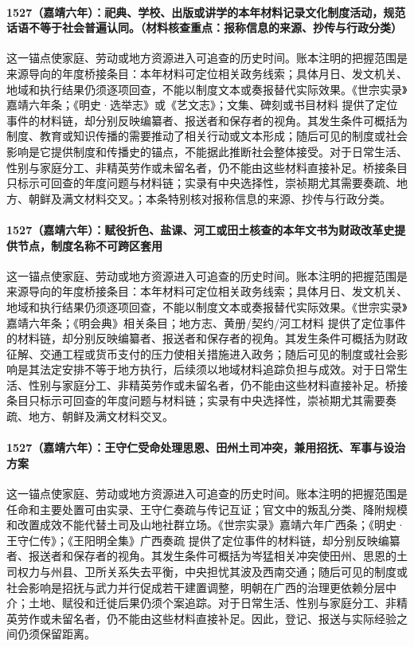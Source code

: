 \paragraph{1527（嘉靖六年）：祀典、学校、出版或讲学的本年材料记录文化制度活动，规范话语不等于社会普遍认同。（材料核查重点：报称信息的来源、抄传与行政分类）} 这一锚点使家庭、劳动或地方资源进入可追查的历史时间。账本注明的把握范围是来源导向的年度桥接条目：本年材料可定位相关政务线索；具体月日、发文机关、地域和执行结果仍须逐项回查，不能以制度文本或奏报替代实际效果。《世宗实录》嘉靖六年条；《明史·选举志》或《艺文志》；文集、碑刻或书目材料 提供了定位事件的材料链，却分别反映编纂者、报送者和保存者的视角。其发生条件可概括为制度、教育或知识传播的需要推动了相关行动或文本形成；随后可见的制度或社会影响是它提供制度和传播史的锚点，不能据此推断社会整体接受。对于日常生活、性别与家庭分工、非精英劳作或未留名者，仍不能由这些材料直接补足。桥接条目只标示可回查的年度问题与材料链；实录有中央选择性，崇祯期尤其需要奏疏、地方、朝鲜及满文材料交叉。；本条特别核对报称信息的来源、抄传与行政分类。

\paragraph{1527（嘉靖六年）：赋役折色、盐课、河工或田土核查的本年文书为财政改革史提供节点，制度名称不可跨区套用} 这一锚点使家庭、劳动或地方资源进入可追查的历史时间。账本注明的把握范围是来源导向的年度桥接条目：本年材料可定位相关政务线索；具体月日、发文机关、地域和执行结果仍须逐项回查，不能以制度文本或奏报替代实际效果。《世宗实录》嘉靖六年条；《明会典》相关条目；地方志、黄册/契约/河工材料 提供了定位事件的材料链，却分别反映编纂者、报送者和保存者的视角。其发生条件可概括为财政征解、交通工程或货币支付的压力使相关措施进入政务；随后可见的制度或社会影响是其法定安排不等于地方执行，后续须以地域材料追踪负担与成效。对于日常生活、性别与家庭分工、非精英劳作或未留名者，仍不能由这些材料直接补足。桥接条目只标示可回查的年度问题与材料链；实录有中央选择性，崇祯期尤其需要奏疏、地方、朝鲜及满文材料交叉。

\paragraph{1527（嘉靖六年）：王守仁受命处理思恩、田州土司冲突，兼用招抚、军事与设治方案} 这一锚点使家庭、劳动或地方资源进入可追查的历史时间。账本注明的把握范围是任命和主要处置可由实录、王守仁奏疏与传记互证；官文中的叛乱分类、降附规模和改置成效不能代替土司及山地社群立场。《世宗实录》嘉靖六年广西条；《明史·王守仁传》；《王阳明全集》广西奏疏 提供了定位事件的材料链，却分别反映编纂者、报送者和保存者的视角。其发生条件可概括为岑猛相关冲突使田州、思恩的土司权力与州县、卫所关系失去平衡，中央担忧其波及西南交通；随后可见的制度或社会影响是招抚与武力并行促成若干建置调整，明朝在广西的治理更依赖分层中介；土地、赋役和迁徙后果仍须个案追踪。对于日常生活、性别与家庭分工、非精英劳作或未留名者，仍不能由这些材料直接补足。因此，登记、报送与实际经验之间仍须保留距离。

